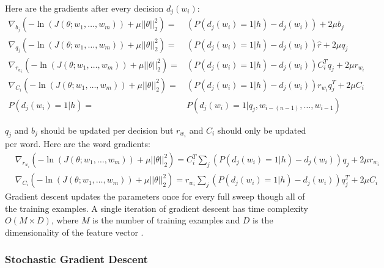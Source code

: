 Here are the gradients after every decision $d_j(w_i)$:
\begin{align}
\nabla_{b_j} \left( -\ln(J(\theta;w_1,\dots, w_m)) +  \mu ||\theta||^2_2 \right)  = &  \left( P \left(d_j(w_i) = 1 | h \right) - d_j(w_i) \right) +2\mu b_j  \label{eq:gradients}
\\
\nabla_{q_j} \left( -\ln(J(\theta;w_1,\dots, w_m)) +  \mu ||\theta||^2_2 \right)  = &\left( P \left(d_j(w_i) = 1 | h \right) - d_j(w_i) \right)\hat{r} +2\mu q_j \nonumber
\\
\nabla_{r_{w_i}} \left( -\ln(J(\theta;w_1,\dots, w_m)) +  \mu ||\theta||^2_2 \right)  = & \left( P \left(d_j(w_i) = 1 | h \right) - d_j(w_i)\right) C_i^T q_j   +2\mu r_{w_i} \nonumber
\\
\nabla_{C_i} \left( -\ln(J(\theta;w_1,\dots, w_m)) +  \mu ||\theta||^2_2 \right)  = &\left( P \left(d_j(w_i) = 1 | h \right) - d_j(w_i) \right) r_{w_i}q_j^T  +2\mu C_i \nonumber
\\
P \left(d_j(w_i) = 1 | h \right)= & P \left(d_j(w_i) = 1 | q_j, w_{i-(n-1)},\dots, w_{i-1} \right) \nonumber
\end{align}

$q_j$ and $b_j$ should be updated per decision but $r_{w_i}$ and $C_i$ should only be updated per word. Here are the word gradients:
\begin{align}
& \nabla_{r_{w_i}} \left( -\ln(J(\theta;w_1,\dots, w_m)) +  \mu ||\theta||^2_2 \right)  =  C_i^T \sum_j \left( P \left(d_j(w_i) = 1 | h \right)  - d_j(w_i) \right)q_j +2\mu r_{w_i} \nonumber
\\
& \nabla_{C_i} \left( -\ln(J(\theta;w_1,\dots, w_m)) +  \mu ||\theta||^2_2 \right)  =  r_{w_i} \sum_j \left( P \left(d_j(w_i) = 1 | h \right) - d_j(w_i) \right) q_j^T  +2\mu C_i
\end{align}
Gradient descent updates the parameters once for every full sweep though all of the training examples. A single iteration of gradient descent has time complexity $O(M\times D)$, where $M$ is the number of training examples and $D$ is the dimensionality of the feature vector \cite{Elkan2013}. 

\subsubsection{Stochastic Gradient Descent}

